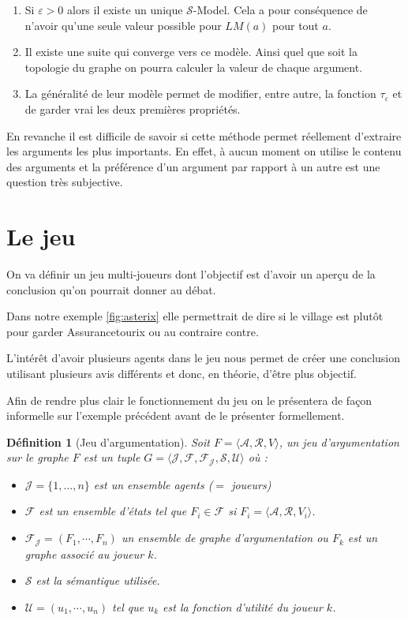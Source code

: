 \documentclass[11pt]{article}
\theoremstyle{defi}
\newtheorem{definition}{Définition}[section]
\theoremstyle{not}
\theoremstyle{prob}
\begin{document}
      \begin{enumerate}
        \item Si $\varepsilon > 0$ alors il existe un unique $\mathcal{S}$-Model. Cela a pour conséquence de n'avoir qu'une seule valeur possible pour $LM(a)$ pour tout $a$.
        \item Il existe une suite qui converge vers ce modèle. %
        Ainsi quel que soit la topologie du graphe on pourra calculer la valeur de chaque argument.
        \item La généralité de leur modèle permet de modifier, entre autre, la fonction $\tau_\varepsilon$ et de garder vrai les deux premières propriétés.
      \end{enumerate}

      En revanche il est difficile de savoir si cette méthode permet réellement d'extraire les arguments les plus importants. En effet, à aucun moment on utilise le contenu des arguments et la préférence d'un argument par rapport à un autre est une question très subjective.

  \section{Le jeu}
    On va définir un jeu multi-joueurs dont l'objectif est d'avoir un aperçu de la conclusion qu'on pourrait donner au débat.

    Dans notre exemple \ref{fig:asterix} elle permettrait de dire si le village est plutôt pour garder Assurancetourix ou au contraire contre.

    L'intérêt d'avoir plusieurs agents dans le jeu nous permet de créer une conclusion utilisant plusieurs avis différents et donc, en théorie, d'être plus objectif.

    Afin de rendre plus clair le fonctionnement du jeu on le présentera de façon informelle sur l'exemple précédent avant de le présenter formellement.

    \begin{definition}[Jeu d'argumentation]
      Soit $F = \langle \mathcal{A}, \mathcal{R}, V \rangle$, un jeu d'argumentation sur le graphe $F$ est un tuple $G = \langle \mathcal{J}, \mathcal{F}, \mathcal{F_\mathcal{J}} , \mathcal{S}, \mathcal{U} \rangle$ où :
      \begin{itemize}
        \item $\mathcal{J} = \{1, \ldots, n\}$ est un ensemble agents ($=$ joueurs)
        \item $\mathcal{F}$ est un ensemble d'états tel que $F_i \in \mathcal{F}$ si $F_i = \langle \mathcal{A}, \mathcal{R}, V_i \rangle$.
        \item $\mathcal{F_\mathcal{J}} = (F_1, \cdots, F_n)$ un ensemble de graphe d'argumentation ou $F_k$ est un graphe associé au joueur $k$.
        \item $\mathcal{S}$ est la sémantique utilisée.
        \item $\mathcal{U} = (u_1, \cdots, u_n)$ tel que $u_k$ est la fonction d'utilité du joueur $k$.
      \end{itemize}
    \end{definition}
\end{document}
